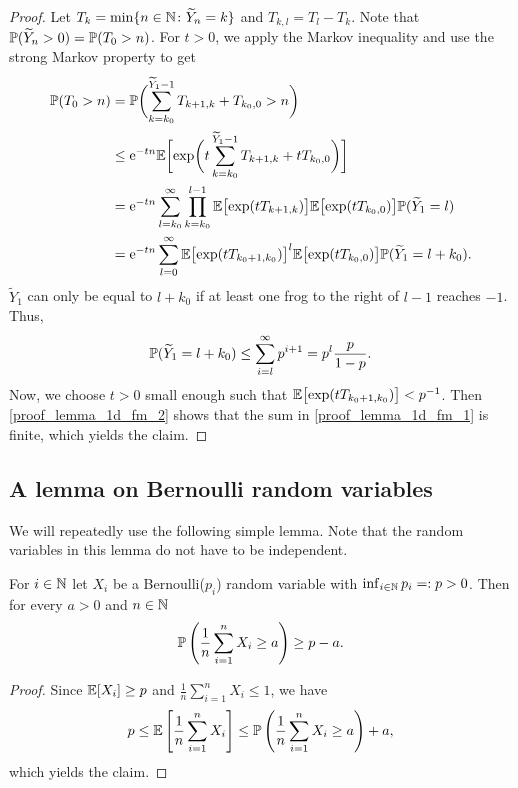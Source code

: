 \begin{proof}
 Let $T_k= \min\{n \in \N \colon \widetilde{Y}_n = k\}$ and $T_{k,l}=T_l - T_k$. Note that $\P(\widetilde{Y}_n >0) = \P(T_0 >n)$. For $t >0$,
we apply the Markov inequality and use the strong Markov property to get
 \begin{align}\label{proof_lemma_1d_fm_1}
 \P(T_0 > n) &=    \P\biggl(\sum_{k=k_0}^{\widetilde{Y}_1-1} T_{k+1,k} + T_{k_0,0} > n\biggr) \nonumber\\
             &\leq \e^{-tn}\E\biggl[\exp\biggl(t \sum_{k=k_0}^{\widetilde{Y}_1-1} T_{k+1,k} + tT_{k_0,0}\biggr)\biggr] \nonumber\\
             &=    \e^{-tn} \sum_{l=k_0}^{\infty} \prod_{k=k_0}^{l-1} \E\bigl[\exp(tT_{k+1,k})\bigr] \E\bigl[\exp( tT_{k_0,0})\bigr]\P(\widetilde{Y}_1 = l) \nonumber\\
             &=    \e^{-tn} \sum_{l=0}^{\infty} \E\bigl[\exp(tT_{k_0+1,k_0})\bigr]^l \E\bigl[\exp( tT_{k_0,0})\bigr]\P(\widetilde{Y}_1 = l+k_0).
 \end{align}
$\widetilde{Y}_1$ can only be equal to $l+k_0$ if at least one frog to the right of $l-1$ reaches $-1$. Thus, 
\begin{equation}\label{proof_lemma_1d_fm_2}
 \P(\widetilde{Y}_1 = l+k_0) \leq \sum_{i=l}^{\infty} p^{i+1} = p^l \frac{p}{1-p}. 
\end{equation}
Now, we choose $t>0$ small enough such that $\E\bigl[\exp(tT_{k_0+1,k_0})\bigr] < p^{-1}$. Then \eqref{proof_lemma_1d_fm_2} shows that the sum in \eqref{proof_lemma_1d_fm_1} is finite, which yields the claim.
\end{proof}





\subsection*{A lemma on Bernoulli random variables}

We will repeatedly use the following simple lemma. Note that the random variables in this lemma do not have to be independent.

\begin{lemma}\label{lemma_sum_rv}
For $i \in \N$ let $X_i$ be a Bernoulli($p_i$) random variable with $\inf_{i\in \N}p_i =:p >0$. Then for every $a >0$ and $n \in \N$ 
\begin{equation*}
\P \left(\frac{1}{n} \sum_{i=1}^n X_i \geq a \right) \geq p-a. 
\end{equation*}
\end{lemma}

\begin{proof}
Since $\E[X_i]\geq p$ and $\frac{1}{n} \sum_{i=1}^n X_i \leq 1$, we have
\begin{align*}
p \leq \E\left[\frac{1}{n}\sum_{i=1}^n X_i \right] \leq \P \left(\frac{1}{n}\sum_{i=1}^n X_i \geq a \right) + a ,
\end{align*}
which yields the claim.
\end{proof}







